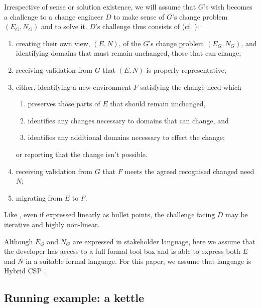 \documentclass[runningheads,a4paper]{llncs}
\begin{document}
Irrespective of sense or solution existence, we will assume that $G$'s
wish becomes a challenge to a change engineer $D$ to make sense of
$G$'s change problem $(E_G,N_G)$ and to solve it. $D$'s challenge thus
consists of (cf. \cite{hall2016a-design}):
%
\begin{enumerate}[label=CPS\arabic*.]
\item creating their own view, $(E, N)$, of the $G$'s change problem
  $(E_G, N_G)$, and identifying domains that must remain unchanged, those that can change;
\item receiving validation from $G$ that $(E, N)$ is properly
  representative;
\item either, identifying a new environment $F$ satisfying the change need which 
\begin{enumerate}[label=\roman*.]
\item preserves those  parts of $E$ that should remain unchanged, 
\item identifies any changes necessary to domains that can change, and 
\item identifies any additional domains necessary to effect the change;
\end{enumerate}
or reporting that the change isn't possible.
\item receiving validation from $G$ that $F$ meets the agreed
  recognised changed need $N$;
\item migrating from $E$ to $F$.
\end{enumerate}

Like \POE{} \cite{hall2016a-design}, even if expressed linearly as
bullet points, the challenge facing $D$ may be iterative and highly
non-linear.

Although $E_G$ and $N_G$ are expressed in stakeholder language, here we assume that the developer has access to a full formal tool box and is able to express both $E$ and $N$ in a suitable formal language. For this paper, we assume that language is Hybrid CSP \cite{chaochen1996formal}.

\subsection{Running example: a kettle}
\end{document}
